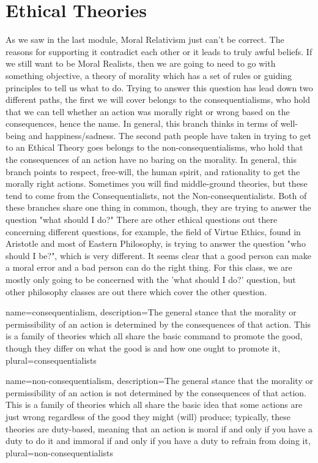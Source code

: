 \section{Ethical Theories}
As we saw in the last module, Moral Relativism just can't be correct. The reasons for supporting it contradict each other or it leads to truly awful beliefs. If we still want to be Moral Realists, then we are going to need to go with something objective, a theory of morality which has a set of rules or guiding principles to tell us what to do.  Trying to answer this question has lead down two different paths, the first we will cover belongs to the \Glspl{consequentialism}, who hold that we can tell whether an action was morally right or wrong based on the consequences, hence the name. In general, this branch thinks in terms of well-being and happiness/sadness. The second path people have taken in trying to get to an Ethical Theory goes belongs to the \Glspl{non-consequentialism}, who hold that the consequences of an action have no baring on the morality. In general, this branch points to respect, free-will, the human spirit, and rationality to get the morally right actions. Sometimes you will find middle-ground theories, but these tend to come from the Consequentialists, not the Non-consequentialists. Both of these branches share one thing in common, though, they are trying to answer the question "what should I do?" There are other ethical questions out there concerning different questions, for example, the field of Virtue Ethics, found in Aristotle and most of Eastern Philosophy, is trying to answer the question "who should I be?", which is very different. It seems clear that a good person can make a moral error and a bad person can do the right thing.  For this class, we are mostly only going to be concerned with the 'what should I do?' question, but other philosophy classes are out there which cover the other question.

{
  name=consequentialism,
  description={The general stance that the morality or permissibility of an action is determined by the consequences of that action. This is a family of theories which all share the basic command to promote the good, though they differ on what the good is and how one ought to promote it},
  plural=consequentialists
}


{
  name=non-consequentialism,
  description={The general stance that the morality or permissibility of an action is not determined by the consequences of that action. This is a family of theories which all share the basic idea that some actions are just wrong regardless of the good they might (will) produce; typically, these theories are duty-based, meaning that an action is moral if and only if you have a duty to do it and immoral if and only if you have a duty to refrain from doing it},
  plural=non-consequentialists
}

